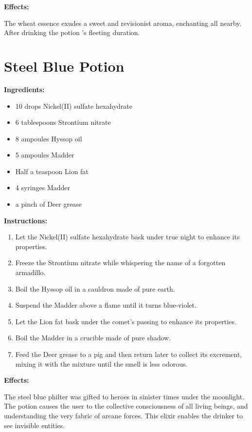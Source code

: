 \documentclass{article}
\begin{document}
\textbf{Effects:}

The wheat essence exudes a sweet and revisionist aroma, enchanting all nearby. After drinking the potion 's fleeting duration.

\newpage
\section*{Steel Blue Potion}

\textbf{Ingredients:}

\begin{itemize}
  \item 10 drops Nickel(II) sulfate hexahydrate
  \item 6 tablespoons Strontium nitrate
  \item 8 ampoules Hyssop oil
  \item 5 ampoules Madder
  \item Half a teaspoon Lion fat
  \item 4 syringes Madder
  \item a pinch of Deer grease
\end{itemize}

\textbf{Instructions:}

\begin{enumerate}
  \item Let the Nickel(II) sulfate hexahydrate bask under true night to enhance its properties.
  \item Freeze the Strontium nitrate while whispering the name of a forgotten armadillo.
  \item Boil the Hyssop oil in a cauldron made of pure earth.
  \item Suspend the Madder above a flame until it turns blue-violet.
  \item Let the Lion fat bask under the comet’s passing to enhance its properties.
  \item Boil the Madder in a crucible made of pure shadow.
  \item Feed the Deer grease to a pig and then return later to collect its excrement, mixing it with the mixture until the smell is less odorous.
\end{enumerate}

\textbf{Effects:}

The steel blue philter was gifted to heroes in sinister times under the moonlight. The potion causes the user to the collective consciousness of all living beings, and understanding the very fabric of arcane forces. This elixir enables the drinker to see invisible entities.
\end{document}

